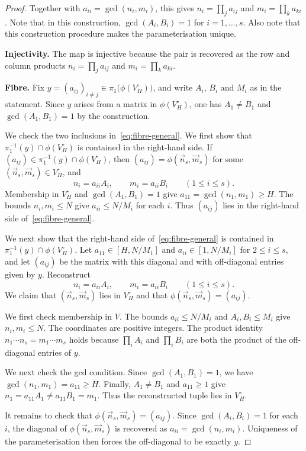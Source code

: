 \begin{proof}
Together with $a_{ii}=\gcd(n_i,m_i)$, this gives $n_i=\prod_j a_{ij}$ and $m_i=\prod_k a_{ki}$.
Note that in this construction, $\gcd(A_i,B_i)=1$ for $i=1,\ldots,s$.
Also note that
this construction procedure makes the parameterisation unique.

\smallskip\noindent\textbf{Injectivity.}
The map is injective because the pair is recovered as the row and column products $n_i=\prod_j a_{ij}$ and $m_i=\prod_k a_{ki}$.

\smallskip\noindent\textbf{Fibre.}
Fix $y=(a_{ij})_{i\neq j}\in\pi_1\bigl(\phi(V_H^\circ)\bigr)$, and write $A_i$, $B_i$ and $M_i$ as in the statement.
Since $y$ arises from a matrix in $\phi(V_H^\circ)$, one has  $A_1\neq B_1$ and $\gcd(A_1,B_1)=1$ by the construction.

We check the two inclusions in~\eqref{eq:fibre-general}.
We first show that $\pi_1^{-1}(y)\cap\phi(V_H^\circ)$ is contained in the right-hand side.
If $(a_{ij})\in\pi_1^{-1}(y)\cap\phi(V_H^\circ)$, then $(a_{ij})=\phi(\vec{n}_s,\vec{m}_s)$ for some $(\vec{n}_s,\vec{m}_s)\in V_H^\circ$, and
\[
n_i=a_{ii}A_i,\qquad m_i=a_{ii}B_i
\qquad(1\leq i\leq s).
\]
Membership in $V_H^\circ$ and $\gcd(A_1,B_1)=1$ give $a_{11}=\gcd(n_1,m_1)\geq H$.
The bounds $n_i,m_i\leq N$ give $a_{ii}\leq N/M_i$ for each $i$.
Thus $(a_{ij})$ lies in the right-hand side of~\eqref{eq:fibre-general}.

We next show that the right-hand side of~\eqref{eq:fibre-general} is contained in $\pi_1^{-1}(y)\cap\phi(V_H^\circ)$.
Let $a_{11}\in[H,N/M_1]$ and $a_{ii}\in[1,N/M_i]$ for $2\leq i\leq s$, and let $(a_{ij})$ be the matrix with this diagonal and with off-diagonal entries given by $y$.
Reconstruct
\[
n_i=a_{ii}A_i,\qquad m_i=a_{ii}B_i
\qquad(1\leq i\leq s).
\]
We claim that $(\vec n_s,\vec m_s)$ lies in $V_H^\circ$ and that $\phi(\vec n_s,\vec m_s)=(a_{ij})$.

We first check membership in $V$.
The bounds $a_{ii}\leq N/M_i$ and $A_i,B_i\leq M_i$ give $n_i,m_i\leq N$.
The coordinates are positive integers.
The product identity $n_1\cdots n_s=m_1\cdots m_s$ holds because $\prod_i A_i$ and $\prod_i B_i$ are both the product of the off-diagonal entries of $y$.

We next check the gcd condition.
Since $\gcd(A_1,B_1)=1$, we have $\gcd(n_1,m_1)=a_{11}\geq H$.
Finally, $A_1\neq B_1$ and $a_{11}\geq 1$ give $n_1=a_{11}A_1\neq a_{11}B_1=m_1$.
Thus the reconstructed tuple lies in $V_H^\circ$.

It remains to check that $\phi(\vec n_s,\vec m_s)=(a_{ij})$.
Since $\gcd(A_i,B_i)=1$ for each $i$, the diagonal of $\phi(\vec n_s,\vec m_s)$ is recovered as $a_{ii}=\gcd(n_i,m_i)$.
Uniqueness of the parameterisation then forces the off-diagonal to be exactly $y$.
\end{proof}

